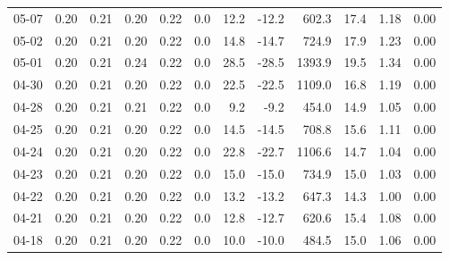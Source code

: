 \begin{threeparttable}
{\begin{tabular}{lrrrrrrrrrrr}
  05-07 &          0.20 &          0.21 &          0.20 &        0.22 &                 0.0 &                12.2 &      -12.2 &               602.3 &             17.4 &            1.18 &                   0.00 \\
  05-02 &          0.20 &          0.21 &          0.20 &        0.22 &                 0.0 &                14.8 &      -14.7 &               724.9 &             17.9 &            1.23 &                   0.00 \\
  05-01 &          0.20 &          0.21 &          0.24 &        0.22 &                 0.0 &                28.5 &      -28.5 &              1393.9 &             19.5 &            1.34 &                   0.00 \\
  04-30 &          0.20 &          0.21 &          0.20 &        0.22 &                 0.0 &                22.5 &      -22.5 &              1109.0 &             16.8 &            1.19 &                   0.00 \\
  04-28 &          0.20 &          0.21 &          0.21 &        0.22 &                 0.0 &                 9.2 &       -9.2 &               454.0 &             14.9 &            1.05 &                   0.00 \\
  04-25 &          0.20 &          0.21 &          0.20 &        0.22 &                 0.0 &                14.5 &      -14.5 &               708.8 &             15.6 &            1.11 &                   0.00 \\
  04-24 &          0.20 &          0.21 &          0.20 &        0.22 &                 0.0 &                22.8 &      -22.7 &              1106.6 &             14.7 &            1.04 &                   0.00 \\
  04-23 &          0.20 &          0.21 &          0.20 &        0.22 &                 0.0 &                15.0 &      -15.0 &               734.9 &             15.0 &            1.03 &                   0.00 \\
  04-22 &          0.20 &          0.21 &          0.20 &        0.22 &                 0.0 &                13.2 &      -13.2 &               647.3 &             14.3 &            1.00 &                   0.00 \\
  04-21 &          0.20 &          0.21 &          0.20 &        0.22 &                 0.0 &                12.8 &      -12.7 &               620.6 &             15.4 &            1.08 &                   0.00 \\
  04-18 &          0.20 &          0.21 &          0.20 &        0.22 &                 0.0 &                10.0 &      -10.0 &               484.5 &             15.0 &            1.06 &                   0.00 \\

\end{tabular}}
\end{threeparttable}
